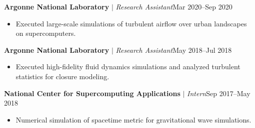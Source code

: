 \documentclass[10pt]{article}
\newcommand{\cvrole}[3]{\textbf{#1} $|$ \textit{#2}\hfill #3}
\begin{document}
\cvrole{Argonne National Laboratory}{Research Assistant}{Mar 2020--Sep 2020}
\begin{itemize}[leftmargin=1.45em,labelindent=0.45em]
  \item Executed large-scale simulations of turbulent airflow over urban landscapes on supercomputers.
\end{itemize}

\cvrole{Argonne National Laboratory}{Research Assistant}{May 2018--Jul 2018}
\begin{itemize}[leftmargin=1.45em,labelindent=0.45em]
  \item Executed high-fidelity fluid dynamics simulations and analyzed turbulent statistics for closure modeling.
\end{itemize}

\cvrole{National Center for Supercomputing Applications}{Intern}{Sep 2017--May 2018}
\begin{itemize}[leftmargin=1.45em,labelindent=0.45em]
  \item Numerical simulation of spacetime metric for gravitational wave simulations.
\end{itemize}

\end{document}
